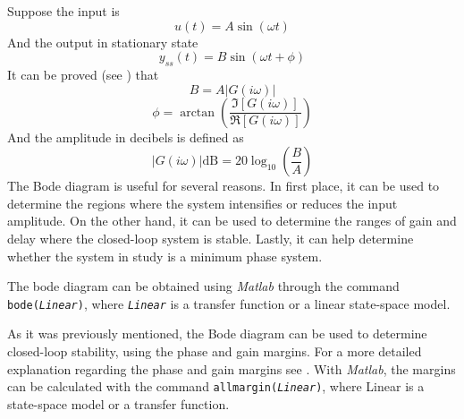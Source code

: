 Suppose the input is
\begin{equation}
    u(t)=A\sin(\omega t)
\end{equation}
And the output in stationary state
\begin{equation}
    y_{ss}(t)=B\sin(\omega t+\phi)
\end{equation}
It can be proved (see \cite[pp. 399-400]{ogata2010modern}) that \[B=A|G(i\omega)|\]\[\phi=\arctan\left(\dfrac{\Im[G(i\omega)]}{\Re[G(i\omega)]}\right)\] And the amplitude in decibels is defined as 
\begin{equation}
    |G(i\omega)|\text{dB}=20\log_{10}\left(\dfrac{B}{A}\right)
\end{equation}
The Bode diagram is useful for several reasons. In first place, it can be used to determine the regions where the system intensifies or reduces the input amplitude. On the other hand, it can be used to determine the ranges of gain and delay where the closed-loop system is stable. Lastly, it can help determine whether the system in study is a minimum phase system.

The bode diagram can be obtained using \textit{Matlab} through the command \texttt{bode(\textit{Linear})}, where \texttt{\textit{Linear}} is a transfer function or a linear state-space model.

As it was previously mentioned, the Bode diagram can be used to determine closed-loop stability, using the phase and gain margins. For a more detailed explanation regarding the phase and gain margins see \cite[pp. 464-468]{ogata2010modern}. With \textit{Matlab}, the margins can be calculated with the command \texttt{allmargin(\textit{Linear})}, where Linear is a state-space model or a transfer function.
